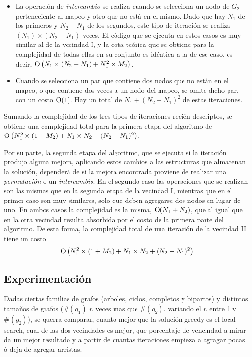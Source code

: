 \begin{itemize}
    \item La operación de \emph{intercambio} se realiza cuando se selecciona
    un nodo de $G_2$ perteneciente al mapeo y otro que no está en el mismo.
    Dado que hay $N_1$ de los primeros y $N_2 - N_1$ de los
    segundos, este tipo de iteración se realiza $(N_1) \times (N_2 - N_1)$
    veces. El código que se ejecuta en estos casos es muy similar al de la
    vecindad I, y la cota teórica que se obtiene para la complejidad de todas
    ellas en su conjunto es idéntica a la de ese caso, es decir,
    $\operatorname{O} \left( N_1 \times (N_2 - N_1) + N_1^2 \times M_2 \right)$.

    \item Cuando se selecciona un par que contiene dos nodos que no están en
    el mapeo, o que contiene dos veces a un nodo del mapeo, se omite dicho
    par, con un costo $\operatorname{O}(1)$. Hay un total de $N_1 + (N_2 - N_1)^2$ de
    estas iteraciones.
\end{itemize}

Sumando la complejidad de los tres tipos de iteraciones recién descriptos, se
obtiene una complejidad total para la primera etapa del algoritmo de
$\operatorname{O} \left( N_1^2 \times (1 + M_2) + N_1 \times N_2 + (N_2 - N_1)^2 \right)$.

Por su parte, la segunda etapa del algoritmo, que se ejecuta si la
iteración produjo alguna mejora, aplicando estos cambios a las estructuras
que almacenan la solución, dependerá de si la mejora encontrada proviene de
realizar una \emph{permutación} o un \emph{intercambio}. En el segundo
caso las operaciones que se realizan son las mismas que en la segunda etapa
de la vecindad I, mientras que en el primer caso son muy similares, solo que
deben agregarse dos nodos en lugar de uno. En ambos casos la complejidad es la
misma, $\operatorname{O} (N_1 + N_2)$, que al igual que en la otra vecindad resulta
absorbida por el costo de la primera parte del algoritmo. De esta forma, la
complejidad total de una iteración de la vecindad II tiene un costo
\[
\operatorname{O} \left( N_1^2 \times (1 + M_2) + N_1 \times N_2 + (N_2 - N_1)^2 \right)
\]


\subsection{Experimentación}

	Dadas ciertas familias de grafos (arboles, ciclos, completos y bipartos) y distintos tamaños de grafos ($\#(g_1)$ $n$ veces mas que $\#(g_2)$, variando el $n$ entre 1 y $\#(g_2)$), se querra comparar, cuanto mejor que la solución greedy es el local search, cual de las dos vecindades es mejor, que porcentaje de vencindad a mirar da un mejor resultado y a partir de cuantas iteraciones empieza a agragar pocas ó deja de agregar arristas.


